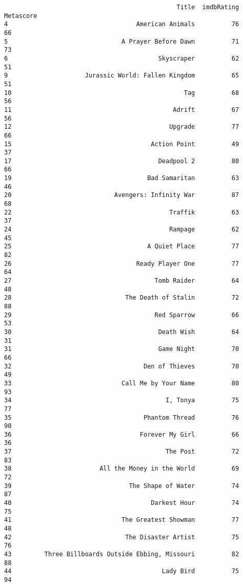 \documentclass[11pt]{article}
\begin{document}
    
    \begin{verbatim}
                                               Title  imdbRating  Metascore
4                                   American Animals          76         66
5                               A Prayer Before Dawn          71         73
6                                         Skyscraper          62         51
9                     Jurassic World: Fallen Kingdom          65         51
10                                               Tag          68         56
11                                            Adrift          67         56
12                                           Upgrade          77         66
15                                      Action Point          49         37
17                                        Deadpool 2          80         66
19                                     Bad Samaritan          63         46
20                            Avengers: Infinity War          87         68
22                                           Traffik          63         37
24                                           Rampage          62         45
25                                     A Quiet Place          77         82
26                                  Ready Player One          77         64
27                                       Tomb Raider          64         48
28                               The Death of Stalin          72         88
29                                       Red Sparrow          66         53
30                                        Death Wish          64         31
31                                        Game Night          70         66
32                                    Den of Thieves          70         49
33                              Call Me by Your Name          80         93
34                                          I, Tonya          75         77
35                                    Phantom Thread          76         90
36                                   Forever My Girl          66         36
37                                          The Post          72         83
38                        All the Money in the World          69         72
39                                The Shape of Water          74         87
40                                      Darkest Hour          74         75
41                              The Greatest Showman          77         48
42                               The Disaster Artist          75         76
43         Three Billboards Outside Ebbing, Missouri          82         88
44                                         Lady Bird          75         94

\end{verbatim}
\end{document}

